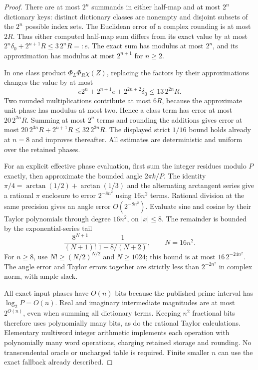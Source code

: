 \begin{proof}
There are at most $2^n$ summands in either half-map and at most $2^n$
dictionary keys: distinct dictionary classes are nonempty and disjoint
subsets of the $2^n$ possible index sets. The Euclidean error of a
complex rounding is at most $2R$. Thus either computed half-map sum
differs from its exact value by at most
$2^n\delta_0+2^{n+1}R\le3\,2^nR=:e$.
The exact sum has modulus at most $2^n$, and its approximation has
modulus at most $2^{n+1}$ for $n\ge2$.

In one class product $\Phi_L\Phi_R\chi(Z)$, replacing the factors
by their approximations changes the value by at most
\[
 e2^n+2^{n+1}e+2^{2n+2}\delta_0
 \le13\,2^{2n}R.
\]
Two rounded multiplications contribute at most $6R$, because the
approximate unit phase has modulus at most two. Hence a class term
has error at most $20\,2^{2n}R$. Summing at most $2^n$ terms and
rounding the additions gives error at most
$20\,2^{3n}R+2^{n+1}R\le32\,2^{3n}R$. The displayed strict
$1/16$ bound holds already at $n=8$ and improves thereafter.
All estimates are deterministic and uniform over the retained phases.

For an explicit effective phase evaluation, first sum the integer
residues modulo $P$ exactly, then approximate the bounded angle
$2\pi k/P$. The identity
$\pi/4=\arctan(1/2)+\arctan(1/3)$ and the alternating arctangent
series give a rational $\pi$ enclosure to error $2^{-8n^2}$ using
$16n^2$ terms. Rational division at the same precision gives an angle
error $O(2^{-8n^2})$. Evaluate sine and cosine by their Taylor
polynomials through degree $16n^2$, on $|x|\le8$. The remainder
is bounded by the exponential-series tail
\[
 \frac{8^{N+1}}{(N+1)!}\,
       \frac1{1-8/(N+2)},\qquad N=16n^2.
\]
For $n\ge8$, use $N!\ge(N/2)^{N/2}$ and $N\ge1024$;
this bound is at most $16\,2^{-24n^2}$.
The angle error and Taylor errors together are strictly less than
$2^{-2n^2}$ in complex norm, with ample slack.

All exact input phases have $O(n)$ bits because the published prime
interval has $\log_2P=O(n)$. Real and imaginary intermediate magnitudes
are at most $2^{O(n)}$, even when summing all dictionary terms.
Keeping $n^2$ fractional bits therefore uses polynomially many bits,
as do the rational Taylor calculations. Elementary multiword integer
arithmetic implements each operation with polynomially many word
operations, charging retained storage and rounding. No transcendental
oracle or uncharged table is required. Finite smaller $n$ can use
the exact fallback already described.
\end{proof}

